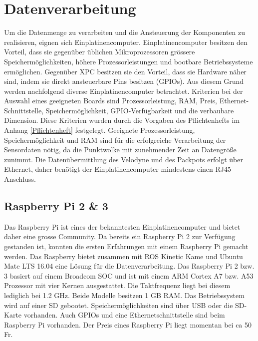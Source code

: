 \section{Datenverarbeitung}
\label{sec:Datenverarbeitung}
Um die Datenmenge zu verarbeiten und die Ansteuerung der Komponenten zu realisieren, eignen sich Einplatinencomputer. Einplatinencomputer besitzen den Vorteil, dass sie gegenüber üblichen Mikroprozessoren grössere Speichermöglichkeiten, höhere Prozessorleistungen und bootbare Betriebssysteme ermöglichen. Gegenüber \ac{XPC} besitzen sie den Vorteil, dass sie Hardware näher sind, indem sie direkt ansteuerbare Pins besitzen (GPIOs). Aus diesem Grund werden nachfolgend diverse Einplatinencomputer betrachtet. Kriterien bei der Auswahl eines geeigneten Boards sind Prozessorleistung, \ac{RAM}, Preis, Ethernet-Schnittstelle, Speichermöglichkeit, GPIO-Verfügbarkeit und die verbaubare Dimension. Diese Kriterien wurden durch die Vorgaben des Pflichtenhefts im Anhang \ref{Pflichtenheft} festgelegt. Geeignete Prozessorleistung, Speichermöglichkeit und \ac{RAM} sind für die erfolgreiche Verarbeitung der Sensordaten nötig, da die Punktwolke mit zunehmender Zeit an Datengröße zunimmt. Die Datenübermittlung des Velodyne und des Packpots erfolgt über Ethernet, daher benötigt der Einplatinencomputer mindestens einen RJ45-Anschluss.

\subsection{Raspberry Pi 2 \& 3}
\label{subsec:Raspberry}
Das Raspberry Pi ist eines der bekanntesten Einplatinencomputer und bietet daher eine grosse Community. Da bereits ein Raspberry Pi 2 zur Verfügung gestanden ist, konnten die ersten Erfahrungen mit einem Raspberry Pi gemacht werden. Das Raspberry bietet zusammen mit ROS Kinetic Kame und Ubuntu Mate LTS 16.04 eine Lösung für die Datenverarbeitung. Das Raspberry Pi 2 bzw. 3 basiert auf einem Broadcom \ac{SOC} und ist mit einem \ac{ARM} Cortex A7 bzw. A53 Prozessor mit vier Kernen ausgestattet. Die Taktfrequenz liegt bei diesem lediglich bei 1.2 GHz. Beide Modelle besitzen 1 GB \ac{RAM}. Das Betriebssystem wird auf einer \ac{SD} gebootet. Speichermöglichkeiten sind über USB oder die SD-Karte vorhanden. Auch GPIOs und eine Ethernetschnittstelle sind beim Raspberry Pi vorhanden. Der Preis eines Raspberry Pi liegt momentan bei ca 50 Fr. \cite{rpi}

